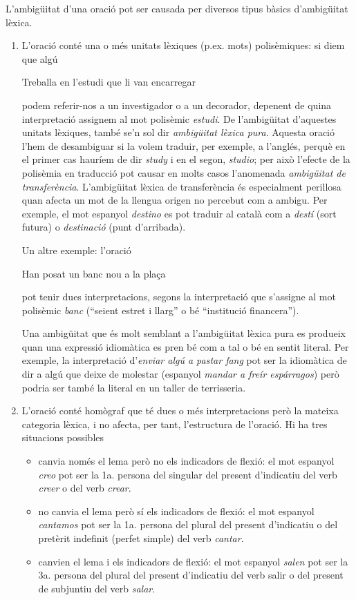 L'ambigüitat d'una oració pot ser causada per diversos tipus bàsics
d'ambigüitat lèxica.
\begin{enumerate}
\item L'oració conté una o més unitats lèxiques (p.ex. mots)
  polisèmiques: si diem que algú 
\begin{exemple}
Treballa en l'estudi que li van
    encarregar
\end{exemple} podem referir-nos a un investigador o a un decorador, depenent de
  quina interpretació  assignem al mot polisèmic \emph{estudi}. De
  l'ambigüitat d'aquestes unitats lèxiques, també se'n sol dir {\em
    ambigüitat lèxica pura}.  Aquesta oració l'hem de desambiguar si
  la volem traduir, per exemple, a l'anglés, perquè en el primer cas
  hauríem de dir \emph{study} i en el segon, \emph{studio}; per això
  l'efecte de la polisèmia en traducció pot causar en molts casos l'anomenada {\em
    ambigüitat de transferència}.  L'ambigüitat lèxica de
  transferència és especialment perillosa quan afecta un mot de la
  llengua origen no percebut com a ambigu. Per exemple, el mot
  espanyol \emph{destino} es pot traduir al català com a {\em
    destí} (sort futura) o \emph{destinació} (punt d'arribada).
  
  Un altre exemple: l'oració 
\begin{exemple}
 Han posat un banc nou a la plaça
\end{exemple}
pot tenir dues interpretacions, segons la interpretació que s'assigne
al mot polisèmic \emph{banc} (``seient estret i llarg'' o bé
``institució financera'').
  
Una ambigüitat que és molt semblant a l'ambigüitat lèxica pura es
produeix quan una expressió idiomàtica es pren bé com a tal o bé en
sentit literal. Per exemple, la interpretació d'\emph{enviar algú a pastar
fang} pot ser la idiomàtica de dir a algú que deixe de molestar
(espanyol \emph{mandar a freír espárragos}) però podria ser també la
literal en un taller de terrisseria.
  
\item L'oració conté homògraf que té dues o
  més interpretacions però la mateixa categoria lèxica, i no afecta,
  per tant, l'estructura de l'oració. Hi ha tres situacions possibles
  \begin{itemize}
  \item canvia només el lema però no els indicadors de flexió: el
    mot espanyol \emph{creo} pot ser la 1a. persona del singular del
    present d'indicatiu del verb \emph{creer} o del verb \emph{crear}.
  \item no canvia el lema però sí els indicadors de flexió: el mot
    espanyol \emph{cantamos} pot ser la 1a. persona del plural del
    present d'indicatiu o del pretèrit indefinit (perfet simple) del
    verb \emph{cantar}.
  \item canvien el lema i els indicadors de flexió: el mot espanyol
    \emph{salen} pot ser la 3a. persona del plural del present
    d'indicatiu del verb salir o del present de subjuntiu del verb
    \emph{salar}.
  \end{itemize}
  

\end{enumerate}
